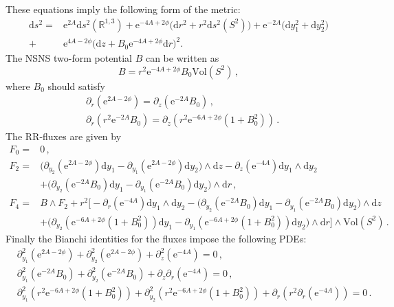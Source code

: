 \documentclass[12pt]{article}
\newcommand{\dd}{\mathrm{d}}
\newcommand{\e}{\mathrm{e}}
\begin{document}
These equations imply the following form of the metric:
\begin{equation}
\label{eq:mink4xS2_metric_IIA}
\begin{split}
\dd s^2=& \e^{2A} \dd s^2(\mathbb{R}^{1,3}) + \e^{-4A+2\phi}\Big(\dd r^2+ r^2 \dd s^2(S^2)\Big)+ \e^{-2A}\Big(\dd y_1^2+ \dd y_2^2\Big) \\
+&  \e^{4A-2\phi}\Big(\dd z+ B_0 \e^{-4A+2\phi}\dd r\Big)^2 .
\end{split}
\end{equation}
The NSNS two-form potential $B$ can be written as
\begin{equation}\label{eq:B0}
B=r^2 \e^{-4A+2\phi}B_0\text{Vol}(S^2) \, ,
\end{equation}
where $B_0$ should satisfy
\begin{subequations}\label{eq: BPS ba10}
	\begin{align}
	&\partial_{r}\left(\e^{2A-2\phi}\right)=\partial_{z}\left(\e^{-2A}B_0\right) \, , \label{eq: BPS ba10 1}\\
	&\partial_{r}\left(r^2\e^{-2A}B_0\right)= \partial_{z}\left(r^2\e^{-6A+2\phi}(1+ B_0^2)\right) \, . \label{eq: BPS ba10 2}
	\end{align}
\end{subequations}
The RR-fluxes are given by
\begin{align}
F_0 =& 0 \, , \nonumber\\[2mm]
F_2=&\big(\partial_{y_2}(\e^{2A-2\phi})\dd y_1-\partial_{y_1}(\e^{2A-2\phi})\dd y_2\big)\wedge \dd z -\partial_{z}(\e^{-4A})\dd y_1\wedge \dd y_2 \nonumber\\
&+\big(\partial_{y_2}(\e^{-2A}B_0)\dd y_1-\partial_{y_1}(\e^{-2A}B_0)\dd y_2\big)\wedge \dd r \, , \\[2mm]
F_4=&B\wedge F_2+r^2\bigg[-\partial_{r}(\e^{-4A})\dd y_1\wedge \dd y_2 -\big(\partial_{y_2}(\e^{-2A}B_0)\dd y_1-\partial_{y_1}(\e^{-2A}B_0)\dd y_2\big)\wedge \dd z \nonumber\\
&+\big(\partial_{y_2}(\e^{-6A+2\phi}(1+B_0^2))\dd y_1-\partial_{y_1}(\e^{-6A+2\phi}(1+B_0^2))\dd y_2\big)\wedge \dd r \bigg]\wedge\text{Vol}(S^2) \, .\nonumber
\end{align}
Finally the Bianchi identities for the fluxes impose the following PDEs:
\begin{align}\label{eq: 4dbianchis}
&\partial^2_{y_1} (\e^{2A-2\phi})+\partial^2_{y_2} (\e^{2A-2\phi})+\partial^2_{z}(\e^{-4A})=0 \, ,\nonumber\\
&\partial^2_{y_1} (\e^{-2A}B_0)+\partial^2_{y_2} (\e^{-2A}B_0)+\partial_{z} \partial_{r}(\e^{-4A})=0 \, ,\\
&\partial^2_{y_1}(r^2 \e^{-6A+2\phi}(1+B_0^2))+\partial^2_{y_2}(r^2 \e^{-6A+2\phi}(1+B_0^2))+ \partial_{r}(r^2\partial_{r}(\e^{-4A}))=0 \, .\nonumber
\end{align}
\end{document}
